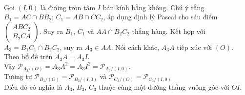 \begin{bt}
{
		\\
		Gọi $(I,0)$ là đường tròn tâm $I$ bán kính bằng không. Chú ý rằng $B_1=AC\cap BB_2$; $C_1=AB \cap CC_2$, áp dụng định lý Pascal cho sáu điểm $\left(\begin{array}{c}ABC_2\\B_2CA \end{array}\right)$. Suy ra $B_1$, $C_1$ và $AA\cap B_2C_2$ thẳng hàng. Kết hợp với $A_3=B_1C_1 \cap B_2C_2$, suy ra $A_3\in AA$. Nói cách khác, $A_3A$ tiếp xúc với $(O)$. Theo bổ đề trên $A_3A=A_3I$. \\
		Vậy $\mathscr{P}_{A_3/(O)}=A_3A^2=A_3I^2=\mathscr{P}_{A_3/(I,0)}.$\\
		Tương tự $\mathscr{P}_{B_3/(O)}=\mathscr{P}_{B_3/(I,0)}$ và $\mathscr{P}_{C_3/(O)}=\mathscr{P}_{C_3/(I,0)}$ \\
		Điều đó có nghĩa là $A_3$, $B_3$, $C_3$ thuộc cùng một đường thẳng vuông góc với $OI$.
	}
\end{bt}

